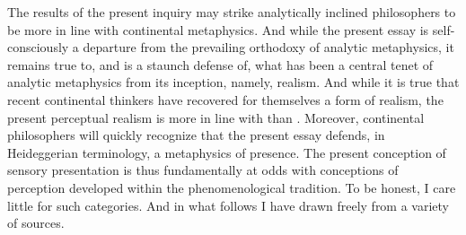The results of the present inquiry may strike analytically inclined philosophers to be more in line with continental metaphysics. And while the present essay is self-consciously a departure from the prevailing orthodoxy of analytic metaphysics, it remains true to, and is a staunch defense of, what has been a central tenet of analytic metaphysics from its inception, namely, realism. And while it is true that recent continental thinkers have recovered for themselves a form of realism, the present perceptual realism is more in line with \citet{Cook-Wilson:1926sf} than \citet{Meillassoux:2008ve}. Moreover, continental philosophers will quickly recognize that the present essay defends, in Heideggerian terminology, a metaphysics of presence. The present conception of sensory presentation is thus fundamentally at odds with conceptions of perception developed within the phenomenological tradition. To be honest, I care little for such categories. And in what follows I have drawn freely from a variety of sources.








